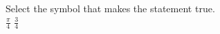\documentclass{ximera}
\author{David Kish}
\begin{document}
\begin{exercise}
Select the symbol that makes the statement true.\\
$\frac{\pi}{4}$ \wordChoice{\choice{$<$}\choice[correct]{$>$}\choice{$=$}} $\frac{3}{4}$ 

\end{exercise}
\end{document}
